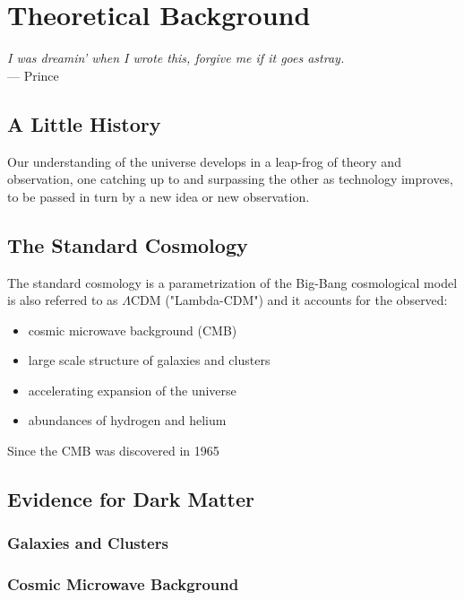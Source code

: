 \chapter{Theoretical Background }\label{theory} %
\begin{flushright}{\slshape    
    I was dreamin' when I wrote this, forgive me if it goes astray. } \\ \medskip
    --- {Prince}
\end{flushright}


\section{A Little History}
Our understanding of the universe develops in a leap-frog of theory and observation, one catching up to and surpassing the other as technology improves, to be passed in turn by a new idea or new observation. 


\section{The Standard Cosmology}
The standard cosmology is a parametrization of the Big-Bang cosmological model is also referred to as $\Lambda$CDM ("Lambda-CDM") and it accounts for the observed:

\begin{itemize}
\item cosmic microwave background (CMB)
\item large scale structure of galaxies and clusters
\item accelerating expansion of the universe
\item abundances of hydrogen and helium
\end{itemize}

Since the CMB was discovered in 1965 

\section{Evidence for Dark Matter}
\subsection{Galaxies and Clusters}
\subsection{Cosmic Microwave Background}

